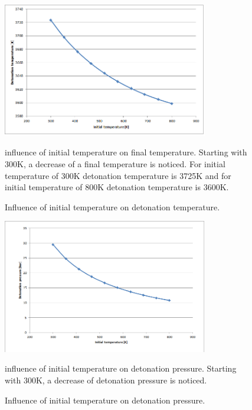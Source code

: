 \documentclass[11pt]{article}
\begin{document}
 \begin{figure} [H]
	\begin{center}
    	\includegraphics[width=0.8\textwidth]{ftemp_temp}
        \caption{Influence of initial temperature on detonation temperature.}
    \end{center}
\normalsize
{influence of initial temperature on final temperature. Starting with 300K, a decrease of a final temperature is noticed. For initial temperature of 300K detonation temperature is 3725K and for initial temperature of 800K detonation temperature is 3600K.}
\end{figure}

 \begin{figure} [H]
	\begin{center}
    	\includegraphics[width=0.8\textwidth]{ftemp_press}
        \caption{Influence of initial temperature on detonation pressure.}
    \end{center}
\normalsize
{influence of initial temperature on detonation pressure. Starting with 300K, a decrease of detonation pressure is noticed. }
\end{figure}
\end{document}
